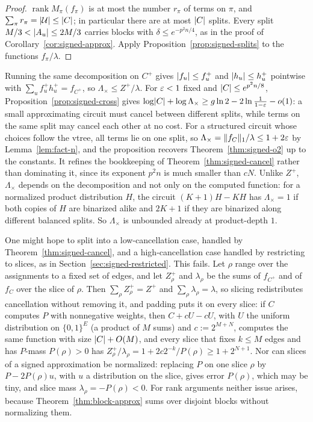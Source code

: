 \begin{proof}
$\operatorname{rank}M_\pi(f_\pi)$ is at most the number $r_\pi$ of terms on $\pi$, and $\sum_\pi r_\pi=\lvert \mathcal{U}\rvert\le\lvert C\rvert$; in particular there are at most $\lvert C\rvert$ splits. Every split $M/3<\lvert A_u\rvert\le2M/3$ carries blocks with $\delta\le e^{-p^2n/4}$, as in the proof of Corollary~\ref{cor:signed-approx}. Apply Proposition~\ref{prop:signed-splits} to the functions $f_\pi/\lambda$.
\end{proof}

Running the same decomposition on $C^+$ gives $\lvert f_u\rvert\le f^+_u$ and $\lvert h_u\rvert\le h^+_u$ pointwise with $\sum_uf^+_uh^+_u=f_{C^+}$, so $\Lambda_\times\le Z^+/\lambda$. For $\varepsilon<1$ fixed and $\lvert C\rvert\le e^{p^2n/8}$, Proposition~\ref{prop:signed-cross} gives $\log\lvert C\rvert+\log\Lambda_\times\ge g\ln2-2\ln\frac1{1-\varepsilon}-o(1)$: a small approximating circuit must cancel between different splits, while terms on the same split may cancel each other at no cost. For a structured circuit whose choices follow the vtree, all terms lie on one split, so $\Lambda_\times=\lVert f_C\rVert_1/\lambda\le1+2\varepsilon$ by Lemma~\ref{lem:fact-n}, and the proposition recovers Theorem~\ref{thm:signed-o2} up to the constants. It refines the bookkeeping of Theorem~\ref{thm:signed-cancel} rather than dominating it, since its exponent $p^2n$ is much smaller than $cN$. Unlike $Z^+$, $\Lambda_\times$ depends on the decomposition and not only on the computed function: for a normalized product distribution $H$, the circuit $(K+1)H-KH$ has $\Lambda_\times=1$ if both copies of $H$ are binarized alike and $2K+1$ if they are binarized along different balanced splits. So $\Lambda_\times$ is unbounded already at product-depth $1$.

\begin{remark}\label{rem:padding}
One might hope to split into a low-cancellation case, handled by Theorem~\ref{thm:signed-cancel}, and a high-cancellation case handled by restricting to slices, as in Section~\ref{sec:signed-restricted}. This fails. Let $\rho$ range over the assignments to a fixed set of edges, and let $Z^+_\rho$ and $\lambda_\rho$ be the sums of $f_{C^+}$ and of $f_C$ over the slice of $\rho$. Then $\sum_\rho Z^+_\rho=Z^+$ and $\sum_\rho\lambda_\rho=\lambda$, so slicing redistributes cancellation without removing it, and padding puts it on every slice: if $C$ computes $P$ with nonnegative weights, then $C+cU-cU$, with $U$ the uniform distribution on $\{0,1\}^E$ (a product of $M$ sums) and $c:=2^{M+N}$, computes the same function with size $\lvert C\rvert+O(M)$, and every slice that fixes $k\le M$ edges and has $P$-mass $P(\rho)>0$ has $Z^+_\rho/\lambda_\rho=1+2c2^{-k}/P(\rho)\ge1+2^{N+1}$. Nor can slices of a signed approximation be normalized: replacing $P$ on one slice $\rho$ by $P-2P(\rho)u$, with $u$ a distribution on the slice, gives error $P(\rho)$, which may be tiny, and slice mass $\lambda_\rho=-P(\rho)<0$. For rank arguments neither issue arises, because Theorem~\ref{thm:block-approx} sums over disjoint blocks without normalizing them.
\end{remark}

